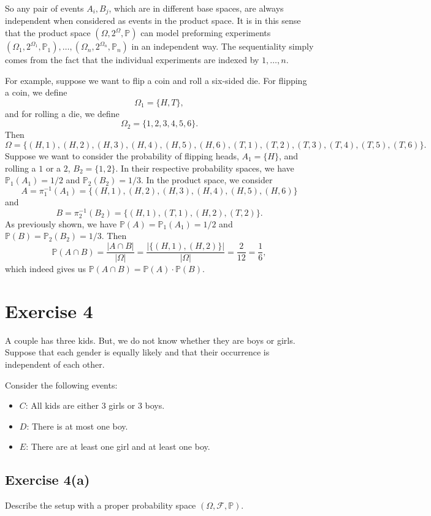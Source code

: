 \documentclass[12pt]{article}
\newenvironment{problem}
    {\begin{lrbox}{\mybox}\begin{minipage}{\textwidth-10pt}}
    {\end{minipage}\end{lrbox}\framebox[\textwidth]{\usebox{\mybox}}}
\newcommand{\FF}{\mathcal{F}}
\renewcommand{\P}{\mathbb{P}}
\begin{document}
So any pair of events $A_i,B_j$, which are in different base spaces, are always independent when considered as events in the product space. It is in this sense that the product space $(\Omega,2^{\Omega},\P)$ can model preforming experiments $(\Omega_1, 2^{\Omega_1}, \P_1),\dots,(\Omega_n, 2^{\Omega_n}, \P_n)$ in an independent way. The sequentiality simply comes from the fact that the individual experiments are indexed by $1,\dots,n$.

For example, suppose we want to flip a coin and roll a six-sided die. For flipping a coin, we define
\[\Omega_1 = \{H,T\},\]
and for rolling a die, we define
\[\Omega_2 = \{1,2,3,4,5,6\}.\]
Then
\[\Omega = \{(H,1),(H,2),(H,3),(H,4),(H,5),(H,6),(T,1),(T,2),(T,3),(T,4),(T,5),(T,6)\}.\]
Suppose we want to consider the probability of flipping heads, $A_1=\{H\}$, and rolling a $1$ or a $2$, $B_2=\{1,2\}$. In their respective probability spaces, we have $\P_1(A_1) = 1/2$ and $\P_2(B_2) = 1/3$. In the product space, we consider
\[A = \pi_1^{-1}(A_1) = \{(H,1),(H,2),(H,3),(H,4),(H,5),(H,6)\}\]
and
\[B = \pi_2^{-1}(B_2) = \{(H,1),(T,1),(H,2),(T,2)\}.\]
As previously shown, we have $\P(A)=\P_1(A_1) = 1/2$ and $\P(B)=\P_2(B_2) = 1/3$. Then
\[\P(A\cap B) = \frac{|A\cap B|}{|\Omega|} = \frac{|\{(H,1),(H,2)\}|}{|\Omega|} = \frac2{12} = \frac16,\]
which indeed gives us $\P(A\cap B) = \P(A)\cdot \P(B)$.

\newpage
\section*{Exercise 4}
\begin{problem}
    A couple has three kids. But, we do not know whether they are boys or girls. Suppose that each gender is equally likely and that their occurrence is independent of each other.
    
    Consider the following events:
    \begin{itemize}[label=]
        \item $C$: All kids are either $3$ girls or $3$ boys.
        \item $D$: There is at most one boy.
        \item $E$: There are at least one girl and at least one boy.
    \end{itemize}
\end{problem}

\subsection*{Exercise 4(a)}
\begin{problem}
    Describe the setup with a proper probability space $(\Omega, \FF, \P)$. 
\end{problem}
\medskip
\end{document}
